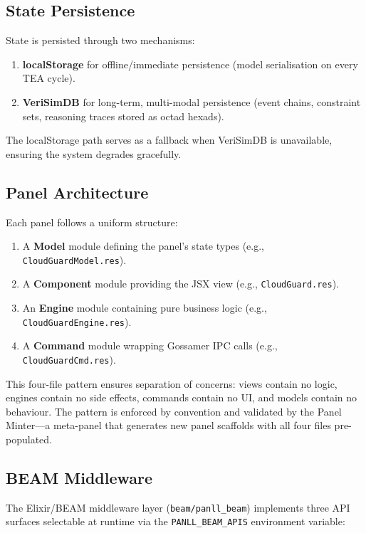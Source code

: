 \documentclass[11pt,a4paper]{article}
\newcommand{\tea}{\textsc{TEA}}
\begin{document}
\subsection{State Persistence}

State is persisted through two mechanisms:
\begin{enumerate}
  \item \textbf{localStorage} for offline/immediate persistence
    (model serialisation on every \tea{} cycle).
  \item \textbf{VeriSimDB} for long-term, multi-modal persistence
    (event chains, constraint sets, reasoning traces stored as
    octad hexads).
\end{enumerate}

The localStorage path serves as a fallback when VeriSimDB is
unavailable, ensuring the system degrades gracefully.

\subsection{Panel Architecture}

Each panel follows a uniform structure:
\begin{enumerate}
  \item A \textbf{Model} module defining the panel's state types
    (e.g., \texttt{CloudGuardModel.res}).
  \item A \textbf{Component} module providing the JSX view
    (e.g., \texttt{CloudGuard.res}).
  \item An \textbf{Engine} module containing pure business logic
    (e.g., \texttt{CloudGuardEngine.res}).
  \item A \textbf{Command} module wrapping Gossamer IPC calls
    (e.g., \texttt{CloudGuardCmd.res}).
\end{enumerate}

This four-file pattern ensures separation of concerns: views contain
no logic, engines contain no side effects, commands contain no UI,
and models contain no behaviour. The pattern is enforced by
convention and validated by the Panel Minter---a meta-panel that
generates new panel scaffolds with all four files pre-populated.

\subsection{BEAM Middleware}

The Elixir/BEAM middleware layer (\texttt{beam/panll\_beam})
implements three API surfaces selectable at runtime via the
\texttt{PANLL\_BEAM\_APIS} environment variable:
\end{document}
